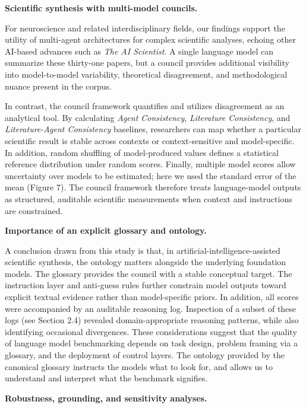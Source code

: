 \documentclass[12pt]{article}
\begin{document}
\noindent\textbf{Scientific synthesis with multi-model councils.}

For neuroscience and related interdisciplinary fields, our findings support the utility of multi-agent architectures for complex scientific analyses, echoing other AI-based advances such as \emph{The AI Scientist}\cite{ref45}. A single language model can summarize these thirty-one papers, but a council provides additional visibility into model-to-model variability, theoretical disagreement, and methodological nuance present in the corpus.

In contrast, the council framework quantifies and utilizes disagreement as an analytical tool. By calculating \emph{Agent Consistency}, \emph{Literature Consistency}, and \emph{Literature-Agent Consistency} baselines, researchers can map whether a particular scientific result is stable across contexts or context-sensitive and model-specific. In addition, random shuffling of model-produced values defines a statistical reference distribution under random scores. Finally, multiple model scores allow uncertainty over models to be estimated; here we used the standard error of the mean (Figure 7). The council framework therefore treats language-model outputs as structured, auditable scientific measurements when context and instructions are constrained.

\noindent\textbf{Importance of an explicit glossary and ontology.}

A conclusion drawn from this study is that, in artificial-intelligence-assisted scientific synthesis, the ontology matters alongside the underlying foundation models. The glossary provides the council with a stable conceptual target. The instruction layer and anti-guess rules\cite{ref58} further constrain model outputs toward explicit textual evidence rather than model-specific priors. In addition, all scores were accompanied by an auditable reasoning log. Inspection of a subset of these logs (see Section 2.4) revealed domain-appropriate reasoning patterns, while also identifying occasional divergences. These considerations suggest that the quality of language model benchmarking depends on task design, problem framing via a glossary, and the deployment of control layers. The ontology provided by the canonical glossary instructs the models what to look for, and allows us to understand and interpret what the benchmark signifies.

\noindent\textbf{Robustness, grounding, and sensitivity analyses.}
\end{document}
